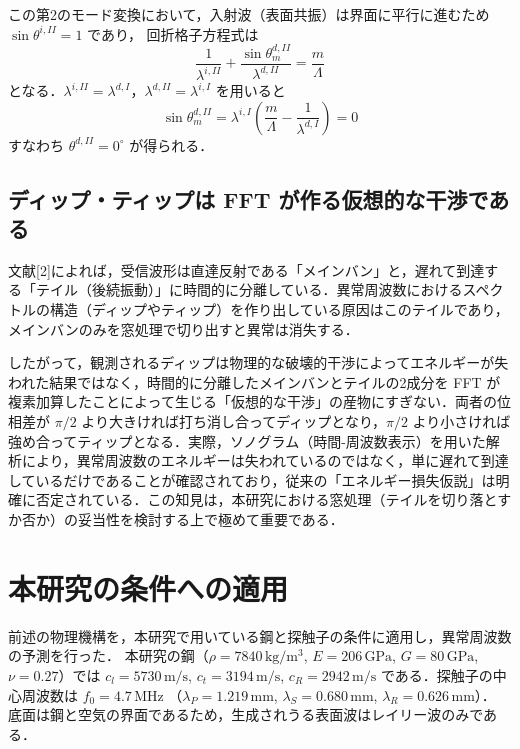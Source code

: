 \documentclass{jarticle}
\begin{document}
この第2のモード変換において，入射波（表面共振）は界面に平行に進むため $\sin\theta^{i,II} = 1$ であり，
回折格子方程式は
\begin{equation}
 \frac{1}{\lambda^{i,II}} + \frac{\sin\theta_m^{d,II}}{\lambda^{d,II}} = \frac{m}{\Lambda}
\end{equation}
となる．$\lambda^{i,II} = \lambda^{d,I}$，$\lambda^{d,II} = \lambda^{i,I}$ を用いると
\begin{equation}
 \sin\theta_m^{d,II}
  = \lambda^{i,I}\left(\frac{m}{\Lambda} - \frac{1}{\lambda^{d,I}}\right) = 0
 \label{eq:double}
\end{equation}
すなわち $\theta^{d,II} = 0^\circ$ が得られる．


\subsection{ディップ・ティップは FFT が作る仮想的な干渉である}
\par
文献[2]によれば，受信波形は直達反射である「メインバン」と，遅れて到達する「テイル（後続振動）」に時間的に分離している．異常周波数におけるスペクトルの構造（ディップやティップ）を作り出している原因はこのテイルであり，メインバンのみを窓処理で切り出すと異常は消失する．

したがって，観測されるディップは物理的な破壊的干渉によってエネルギーが失われた結果ではなく，時間的に分離したメインバンとテイルの2成分を FFT が複素加算したことによって生じる「仮想的な干渉」の産物にすぎない．両者の位相差が $\pi/2$ より大きければ打ち消し合ってディップとなり，$\pi/2$ より小さければ強め合ってティップとなる．実際，ソノグラム（時間-周波数表示）を用いた解析により，異常周波数のエネルギーは失われているのではなく，単に遅れて到達しているだけであることが確認されており，従来の「エネルギー損失仮説」は明確に否定されている．この知見は，本研究における窓処理（テイルを切り落とすか否か）の妥当性を検討する上で極めて重要である．


\section{本研究の条件への適用}
\par
前述の物理機構を，本研究で用いている鋼と探触子の条件に適用し，異常周波数の予測を行った．
本研究の鋼（$\rho = 7840\,\mathrm{kg/m^3}$, $E = 206\,\mathrm{GPa}$,
$G = 80\,\mathrm{GPa}$, $\nu = 0.27$）では
$c_l = 5730\,\mathrm{m/s}$, $c_t = 3194\,\mathrm{m/s}$,
$c_R = 2942\,\mathrm{m/s}$ である．探触子の中心周波数は $f_0 = 4.7\,\mathrm{MHz}$
（$\lambda_P = 1.219\,\mathrm{mm}$, $\lambda_S = 0.680\,\mathrm{mm}$,
$\lambda_R = 0.626\,\mathrm{mm}$）．
底面は鋼と空気の界面であるため，生成されうる表面波はレイリー波のみである．
\end{document}
